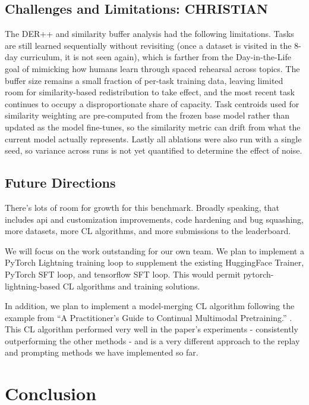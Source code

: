\documentclass{article}
\begin{document}
\subsection{Challenges and Limitations: CHRISTIAN}
The DER++ and similarity buffer analysis had the following limitations. Tasks are still learned sequentially
without revisiting (once a dataset is visited in the 8-day curriculum, it is not seen
again), which is farther from the Day-in-the-Life goal of mimicking how
humans learn through spaced rehearsal across topics. The buffer size remains
a small fraction of per-task training data, leaving limited room for
similarity-based redistribution to take effect, and the most recent task
continues to occupy a disproportionate share of capacity. Task centroids used
for similarity weighting are pre-computed from the frozen base model rather
than updated as the model fine-tunes, so the similarity metric can drift from
what the current model actually represents. Lastly all ablations were also run with
a single seed, so variance across runs is not yet quantified to determine the effect of noise.

\subsection{Future Directions}

There's lots of room for growth for this benchmark. Broadly speaking, that includes api and customization
improvements, code hardening and bug squashing, more datasets, more CL algorithms, and more submissions to
the leaderboard.

We will focus on the work outstanding for our own team. We plan to implement a PyTorch Lightning training
loop to supplement the existing HuggingFace Trainer, PyTorch SFT loop, and tensorflow SFT loop. This would
permit pytorch-lightning-based CL algorithms and training solutions.

In addition, we plan to implement a model-merging CL algorithm following the example from ``A Practitioner's
Guide to Continual Multimodal Pretraining.'' \cite{fomo-in-flux}. This CL algorithm performed very well in
the paper's experiments - consistently outperforming the other methods - and is a very different approach to
the replay and prompting methods we have implemented so far.

\section{Conclusion}
\end{document}
